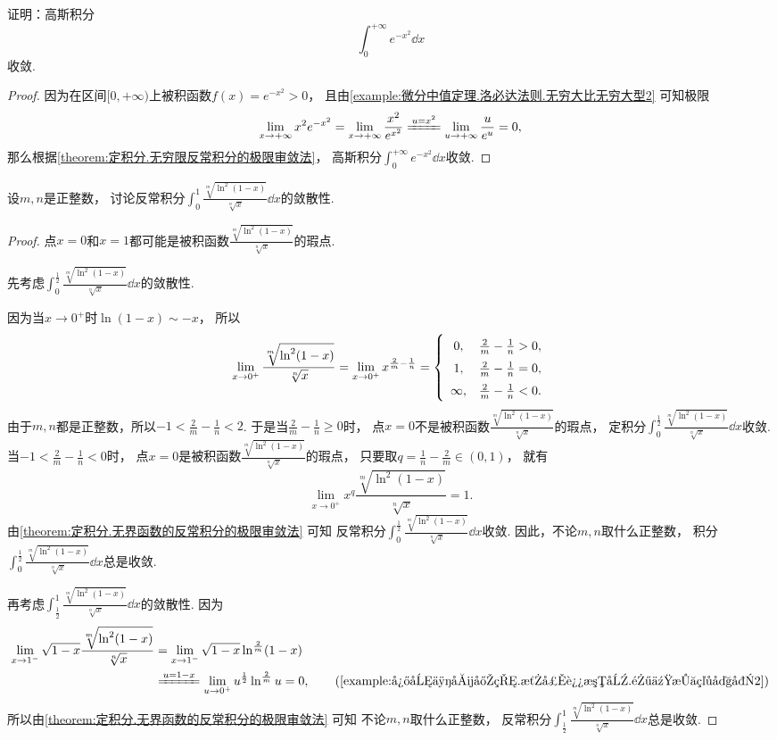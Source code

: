 \begin{example}\label{example:定积分.高斯积分的收敛性}
证明：高斯积分\[
	\int_0^{+\infty} e^{-x^2} \dd{x}
\]收敛.
\begin{proof}
因为在区间\([0,+\infty)\)上被积函数\(f(x) = e^{-x^2} > 0\)，
且由\cref{example:微分中值定理.洛必达法则.无穷大比无穷大型2} 可知极限\[
	\lim_{x\to+\infty} x^2 e^{-x^2}
	= \lim_{x\to+\infty} \frac{x^2}{e^{x^2}}
	\xlongequal{u=x^2} \lim_{u\to+\infty} \frac{u}{e^u}
	= 0,
\]
那么根据\cref{theorem:定积分.无穷限反常积分的极限审敛法}，
高斯积分\(\int_0^{+\infty} e^{-x^2} \dd{x}\)收敛.
\end{proof}
\end{example}

\begin{example}
设\(m,n\)是正整数，
讨论反常积分\(\int_0^1 \frac{\sqrt[m]{\ln^2(1-x)}}{\sqrt[n]{x}} \dd{x}\)的敛散性.
\begin{proof}
点\(x=0\)和\(x=1\)都可能是被积函数\(\frac{\sqrt[m]{\ln^2(1-x)}}{\sqrt[n]{x}}\)的瑕点.

先考虑\(\int_0^{\frac12} \frac{\sqrt[m]{\ln^2(1-x)}}{\sqrt[n]{x}} \dd{x}\)的敛散性.

因为当\(x\to0^+\)时\(\ln(1-x) \sim -x\)，
所以\[
	\lim_{x\to0^+} \frac{\sqrt[m]{\ln^2(1-x)}}{\sqrt[n]{x}}
	= \lim_{x\to0^+} x^{\frac2m-\frac1n}
	= \left\{ \def\arraystretch{1.5} \begin{array}{cl}
		0, & \frac2m-\frac1n>0, \\
		1, & \frac2m-\frac1n=0, \\
		\infty, & \frac2m-\frac1n<0.
	\end{array} \right.
\]
由于\(m,n\)都是正整数，所以\(-1<\frac2m-\frac1n<2\).
于是当\(\frac2m-\frac1n\geq0\)时，
点\(x=0\)不是被积函数\(\frac{\sqrt[m]{\ln^2(1-x)}}{\sqrt[n]{x}}\)的瑕点，
定积分\(\int_0^{\frac12} \frac{\sqrt[m]{\ln^2(1-x)}}{\sqrt[n]{x}} \dd{x}\)收敛.
当\(-1<\frac2m-\frac1n<0\)时，
点\(x=0\)是被积函数\(\frac{\sqrt[m]{\ln^2(1-x)}}{\sqrt[n]{x}}\)的瑕点，
只要取\(q=\frac1n-\frac2m\in(0,1)\)，
就有\[
	\lim_{x\to0^+} x^q \frac{\sqrt[m]{\ln^2(1-x)}}{\sqrt[n]{x}} = 1.
\]
由\cref{theorem:定积分.无界函数的反常积分的极限审敛法} 可知
反常积分\(\int_0^{\frac12} \frac{\sqrt[m]{\ln^2(1-x)}}{\sqrt[n]{x}} \dd{x}\)收敛.
因此，不论\(m,n\)取什么正整数，
积分\(\int_0^{\frac12} \frac{\sqrt[m]{\ln^2(1-x)}}{\sqrt[n]{x}} \dd{x}\)总是收敛.

再考虑\(\int_{\frac12}^1 \frac{\sqrt[m]{\ln^2(1-x)}}{\sqrt[n]{x}} \dd{x}\)的敛散性.
因为\begin{align*}
	\lim_{x\to1^-} \sqrt{1-x} \frac{\sqrt[m]{\ln^2(1-x)}}{\sqrt[n]{x}}
	&= \lim_{x\to1^-} \sqrt{1-x} \ln^{\frac2m}(1-x) \\
	&\xlongequal{u=1-x}
	\lim_{u\to0^+} u^{\frac12} \ln^{\frac2m} u
	= 0, \tag{\cref{example:微分中值定理.洛必达法则.零乘无穷大型2}}
\end{align*}
所以由\cref{theorem:定积分.无界函数的反常积分的极限审敛法} 可知
不论\(m,n\)取什么正整数，
反常积分\(\int_{\frac12}^1 \frac{\sqrt[m]{\ln^2(1-x)}}{\sqrt[n]{x}} \dd{x}\)总是收敛.
\end{proof}
\end{example}
